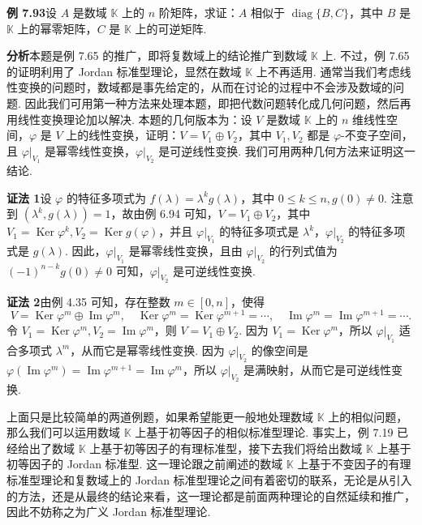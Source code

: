 \documentclass[UTF8, 12pt, fontset=fandol, oneside]{ctexart}
\begin{document}
\noindent\textbf{例 7.93}\quad 设 $A$ 是数域 $\mathbb{K}$ 上的 $n$ 阶矩阵，求证：$A$ 相似于 $\operatorname{diag}\{B,C\}$，其中 $B$ 是 $\mathbb{K}$ 上的幂零矩阵，$C$ 是 $\mathbb{K}$ 上的可逆矩阵.

\noindent\textbf{分析}\quad 本题是例 7.65 的推广，即将复数域上的结论推广到数域 $\mathbb{K}$ 上. 不过，例 7.65 的证明利用了 Jordan 标准型理论，显然在数域 $\mathbb{K}$ 上不再适用. 通常当我们考虑线性变换的问题时，数域都是事先给定的，从而在讨论的过程中不会涉及数域的问题. 因此我们可用第一种方法来处理本题，即把代数问题转化成几何问题，然后再用线性变换理论加以解决. 本题的几何版本为：设 $V$ 是数域 $\mathbb{K}$ 上的 $n$ 维线性空间，$\varphi$ 是 $V$ 上的线性变换，证明：$V=V_1\oplus V_2$，其中 $V_1,V_2$ 都是 $\varphi$-不变子空间，且 $\varphi|_{V_1}$ 是幂零线性变换，$\varphi|_{V_2}$ 是可逆线性变换. 我们可用两种几何方法来证明这一结论.

\noindent\textbf{证法 1}\quad 设 $\varphi$ 的特征多项式为 $f(\lambda)=\lambda^kg(\lambda)$，其中 $0\le k\le n,g(0)\ne0$. 注意到 $(\lambda^k,g(\lambda))=1$，故由例 6.94 可知，$V=V_1\oplus V_2$，其中 $V_1=\operatorname{Ker}\varphi^k,V_2=\operatorname{Ker}g(\varphi)$，并且 $\varphi|_{V_1}$ 的特征多项式是 $\lambda^k$，$\varphi|_{V_2}$ 的特征多项式是 $g(\lambda)$. 因此，$\varphi|_{V_1}$ 是幂零线性变换，且由 $\varphi|_{V_2}$ 的行列式值为 $(-1)^{n-k}g(0)\ne0$ 可知，$\varphi|_{V_2}$ 是可逆线性变换.

\noindent\textbf{证法 2}\quad 由例 4.35 可知，存在整数 $m\in[0,n]$，使得
\[
V=\operatorname{Ker}\varphi^m\oplus\operatorname{Im}\varphi^m,\quad
\operatorname{Ker}\varphi^m=\operatorname{Ker}\varphi^{m+1}=\cdots,\quad
\operatorname{Im}\varphi^m=\operatorname{Im}\varphi^{m+1}=\cdots.
\]
令 $V_1=\operatorname{Ker}\varphi^m,V_2=\operatorname{Im}\varphi^m$，则 $V=V_1\oplus V_2$. 因为 $V_1=\operatorname{Ker}\varphi^m$，所以 $\varphi|_{V_1}$ 适合多项式 $\lambda^m$，从而它是幂零线性变换. 因为 $\varphi|_{V_2}$ 的像空间是 $\varphi(\operatorname{Im}\varphi^m)=\operatorname{Im}\varphi^{m+1}=\operatorname{Im}\varphi^m$，所以 $\varphi|_{V_2}$ 是满映射，从而它是可逆线性变换.

上面只是比较简单的两道例题，如果希望能更一般地处理数域 $\mathbb{K}$ 上的相似问题，那么我们可以运用数域 $\mathbb{K}$ 上基于初等因子的相似标准型理论. 事实上，例 7.19 已经给出了数域 $\mathbb{K}$ 上基于初等因子的有理标准型，接下去我们将给出数域 $\mathbb{K}$ 上基于初等因子的 Jordan 标准型. 这一理论跟之前阐述的数域 $\mathbb{K}$ 上基于不变因子的有理标准型理论和复数域上的 Jordan 标准型理论之间有着密切的联系，无论是从引入的方法，还是从最终的结论来看，这一理论都是前面两种理论的自然延续和推广，因此不妨称之为广义 Jordan 标准型理论.
\end{document}
